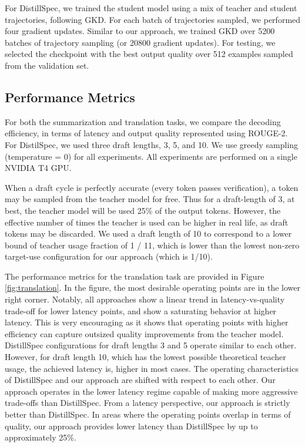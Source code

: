For DistillSpec, we trained the student model using a mix of teacher and student trajectories, following GKD. For each batch of trajectories sampled, we performed four gradient updates. Similar to our approach, we trained GKD over 5200 batches of trajectory sampling (or 20800 gradient updates). For testing, we selected the checkpoint with the best output quality over 512 examples sampled from the validation set.

\subsection{Performance Metrics}

For both the summarization and translation tasks, we compare the decoding efficiency, in terms of latency and output quality represented using ROUGE-2. For DistilSpec, we used three draft lengths, 3, 5, and 10. We use greedy sampling (temperature = 0) for all experiments. All experiments are performed on a single NVIDIA T4 GPU.

When a draft cycle is perfectly accurate (every token passes verification), a token may be sampled from the teacher model for free. Thus for a draft-length of 3, at best, the teacher model will be used 25\% of the output tokens. However, the effective number of times the teacher is used can be higher in real life, as draft tokens may be discarded. We used a draft length of 10 to correspond to a lower bound of teacher usage fraction of 1 / 11, which is lower than the lowest non-zero target-use configuration for our approach (which is 1/10).

The performance metrics for the translation task are provided in Figure \ref{fig:translation}. In the figure, the most desirable operating points are in the lower right corner. Notably, all approaches show a linear trend in latency-vs-quality trade-off for lower latency points, and show a saturating behavior at higher latency. This is very encouraging as it shows that operating points with higher efficiency can capture outsized quality improvements from the teacher model. DistillSpec configurations for draft lengths 3 and 5 operate similar to each other. However, for draft length 10, which has the lowest possible theoretical teacher usage, the achieved latency is, higher in most cases. The operating characteristics of DistillSpec and our approach are shifted with respect to each other. Our approach operates in the lower latency regime capable of making more aggressive trade-offs than DistillSpec. From a latency perspective, our approach is strictly better than DistillSpec. In areas where the operating points overlap in terms of quality, our approach provides lower latency than DistillSpec by up to approximately 25\%.

